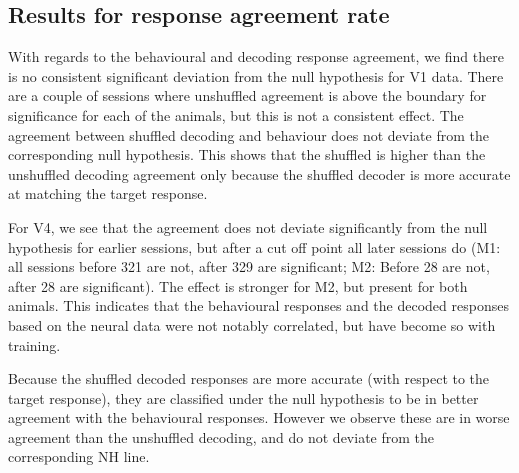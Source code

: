 \subsection{Results for response agreement rate}


With regards to the behavioural and decoding response agreement, we find there is no consistent significant deviation from the null hypothesis for \ac{V1} data.
There are a couple of sessions where unshuffled agreement is above the boundary for significance for each of the animals, but this is not a consistent effect.
The agreement between shuffled decoding and behaviour does not deviate from the corresponding null hypothesis.
This shows that the shuffled is higher than the unshuffled decoding agreement only because the shuffled decoder is more accurate at matching the target response.

For \ac{V4}, we see that the agreement does not deviate significantly from the null hypothesis for earlier sessions, but after a cut off point all later sessions do (\ac{M1}: all sessions before 321 are not, after 329 are significant; \ac{M2}: Before 28 are not, after 28 are significant).
The effect is stronger for \ac{M2}, but present for both animals.
This indicates that the behavioural responses and the decoded responses based on the neural data were not notably correlated, but have become so with training.

Because the shuffled decoded responses are more accurate (with respect to the target response), they are classified under the null hypothesis to be in better agreement with the behavioural responses.
However we observe these are in worse agreement than the unshuffled decoding, and do not deviate from the corresponding \ac{NH} line.

%
%

